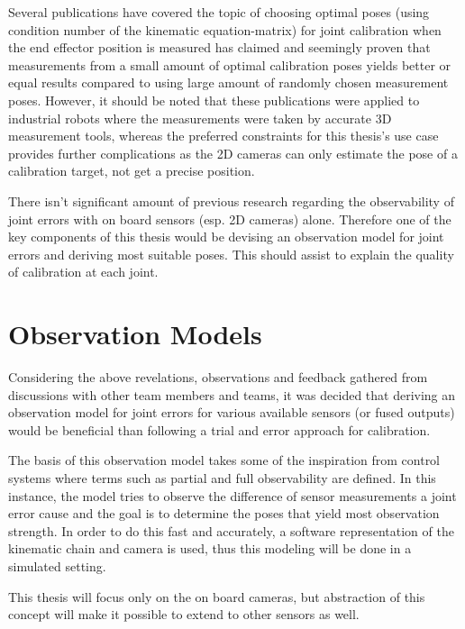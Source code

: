 \documentclass[english, printversion, nomenclature, notitle]{tuvisionthesis} %
\begin{document}
Several publications have covered the topic of choosing optimal poses (using condition number of the kinematic equation-matrix) for joint calibration when the end effector position is measured has claimed and seemingly proven that measurements from a small amount of optimal calibration poses yields better or equal results compared to using large amount of randomly chosen measurement poses. However, it should be noted that these publications were applied to industrial robots where the measurements were taken by accurate 3D measurement tools, whereas the preferred constraints for this thesis's use case provides further complications as the 2D cameras can only estimate the pose of a calibration target, not get a precise position.

There isn't significant amount of previous research regarding the observability of joint errors with on board sensors (esp. 2D cameras) alone. Therefore one of the key components of this thesis would be devising an observation model for joint errors and deriving most suitable poses. This should assist to explain the quality of calibration at each joint.

\section{Observation Models}
Considering the above revelations, observations and feedback gathered from discussions with other team members and teams, it was decided that deriving an observation model for joint errors for various available sensors (or fused outputs) would be beneficial than following a trial and error approach for calibration.

The basis of this observation model takes some of the inspiration from control systems where terms such as partial and full observability are defined. In this instance, the model tries to observe the difference of sensor measurements a joint error cause and the goal is to determine the poses that yield most observation strength. In order to do this fast and accurately, a software representation of the kinematic chain and camera is used, thus this modeling will be done in a simulated setting.

This thesis will focus only on the on board cameras, but abstraction of this concept will make it possible to extend to other sensors as well.
\end{document}
